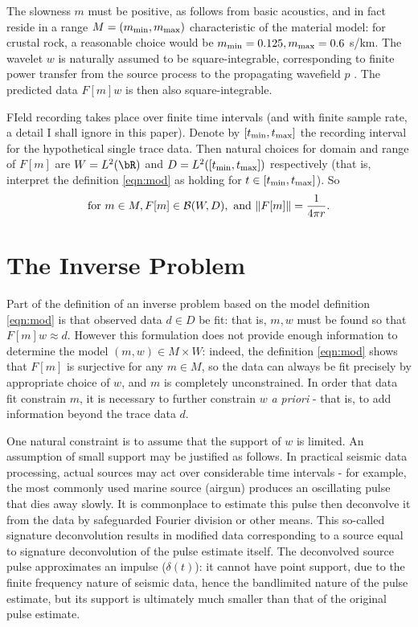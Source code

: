 The slowness $m$ must be positive, as follows from basic acoustics,
and in fact reside in a range $M=(m_{\rm min}, m_{\rm max})$ characteristic of the
material model: for crustal rock, a reasonable choice would be
$m_{\rm min}=0.125, m_{\rm max}=0.6$ s/km. The wavelet $w$ is
naturally assumed to be 
square-integrable, corresponding to finite power transfer from the
source process to the propagating wavefield $p$
\cite[]{SantosaSymes:00}. The predicted data $F[m]w$ is then also
square-integrable.

FIeld recording takes place over finite time intervals (and with
finite sample rate, a detail I shall ignore in this paper). Denote by
$[t_{\rm min},t_{\rm max}]$ the recording interval for the
hypothetical single trace data. Then natural choices for domain and
range of $F[m]$ are $W = L^2(\bR)$ and $D=L^2([t_{\rm min},t_{\rm
  max}])$ respectively (that is, interpret the definition \ref{eqn:mod}
as holding for $t \in [t_{\rm min},t_{\rm  max}]$). So
\begin{equation}
  \label{eqn:mapprop}
  \mbox{for }m \in M, F[m] \in {\cal B}(W,D),\mbox{ and }\|F[m]\| =
  \frac{1}{4\pi r}.
\end{equation}

\section{The Inverse Problem}

Part of the definition of an inverse problem based on the model
definition \ref{eqn:mod} is that observed data $d \in D$ be fit: that
is, $m, w$ must be found so that $F[m]w \approx d$. However this
formulation does not provide enough information to determine the model
$(m,w) \in M \times W$: indeed, the definition
\ref{eqn:mod} shows that $F[m]$ is surjective for any $m \in M$, so
the data can always be fit precisely by appropriate choice of $w$, and
$m$ is completely
unconstrained.  In order that data fit constrain $m$, it is necessary
to further constrain $w$ {\em a priori} - that is, to add information
beyond the trace data $d$.

One natural constraint is to assume that the support of $w$ is
limited. An assumption of small support may be justified as
follows. In practical seismic data processing, actual sources may act
over considerable time intervals - for example, the most commonly used
marine source (airgun) produces an oscillating pulse that dies away
slowly. It is commonplace to estimate this pulse then deconvolve it
from the data by safeguarded Fourier division or other means. This
so-called signature deconvolution results in modified data
corresponding to a source equal to signature deconvolution of the
pulse estimate itself. The deconvolved source pulse approximates an
impulse ($\delta(t)$): it cannot have point support, due to the finite
frequency nature of seismic data, hence the bandlimited nature of the
pulse estimate, but its support is ultimately much smaller than that
of the original pulse estimate.

